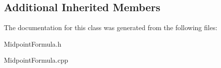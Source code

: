 \subsection*{Additional Inherited Members}


The documentation for this class was generated from the following files\+:\begin{DoxyCompactItemize}
\item 
Midpoint\+Formula.\+h\item 
Midpoint\+Formula.\+cpp\end{DoxyCompactItemize}
